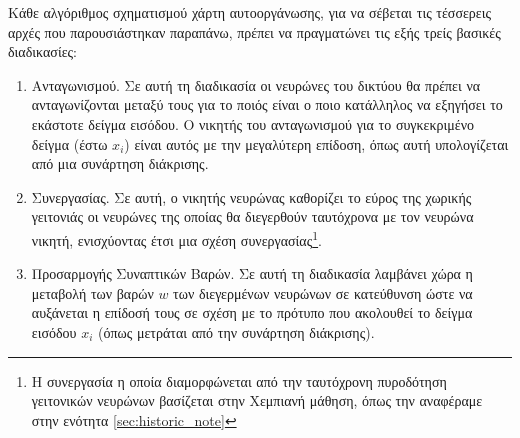 Κάθε αλγόριθμος σχηματισμού χάρτη αυτο\textendash οργάνωσης, για να σέβεται τις τέσσερεις αρχές που παρουσιάστηκαν παραπάνω, πρέπει να πραγματώνει τις εξής τρείς βασικές διαδικασίες:
\begin{enumerate}
  \item Ανταγωνισμού. Σε αυτή τη διαδικασία οι νευρώνες του δικτύου θα πρέπει να ανταγωνίζονται μεταξύ τους για το ποιός είναι ο ποιο κατάλληλος να εξηγήσει το εκάστοτε δείγμα εισόδου. Ο νικητής του ανταγωνισμού για το συγκεκριμένο δείγμα (έστω $x_i$) είναι αυτός με την μεγαλύτερη επίδοση, όπως αυτή υπολογίζεται από μια συνάρτηση διάκρισης.
  \item Συνεργασίας. Σε αυτή, ο νικητής νευρώνας καθορίζει το εύρος της χωρικής γειτονιάς οι νευρώνες της οποίας θα διεγερθούν ταυτόχρονα με τον νευρώνα νικητή, ενισχύοντας έτσι μια σχέση συνεργασίας\footnote{Η συνεργασία η οποία διαμορφώνεται από την ταυτόχρονη πυροδότηση γειτονικών νευρώνων βασίζεται στην Χεμπιανή μάθηση, όπως την αναφέραμε στην ενότητα \ref{sec:historic_note}}.
  \item  Προσαρμογής Συναπτικών Βαρών. Σε αυτή τη διαδικασία λαμβάνει χώρα η μεταβολή των βαρών $w$ των διεγερμένων νευρώνων σε κατεύθυνση ώστε να αυξάνεται η επίδοσή τους σε σχέση με το πρότυπο που ακολουθεί το δείγμα εισόδου $x_i$ (όπως μετράται από την συνάρτηση διάκρισης).\cite{haykin2009neural}
\end{enumerate}

